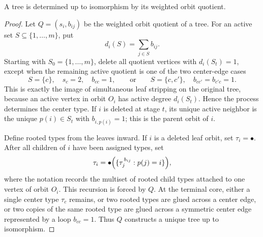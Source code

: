 \documentclass[10pt,a4paper]{amsart}
\begin{document}
\begin{theorem}
\label{thm:tree-quotient-rigidity}
A tree is determined up to isomorphism by its weighted orbit quotient.
\end{theorem}

\begin{proof}
Let \(Q=(s_i,b_{ij})\) be the weighted orbit quotient of a tree.  For an active
set \(S\subseteq\{1,\ldots,m\}\), put
\[
        d_i(S)=\sum_{j\in S} b_{ij}.
\]
Starting with \(S_0=\{1,\ldots,m\}\), delete all quotient vertices with
\(d_i(S_t)=1\), except when the remaining active quotient is one of the two
center-edge cases
\[
        S=\{c\},\quad s_c=2,\quad b_{cc}=1,
        \qquad\text{or}\qquad
        S=\{c,c'\},\quad b_{cc'}=b_{c'c}=1.
\]
This is exactly the image of simultaneous leaf stripping on the original tree,
because an active vertex in orbit \(O_i\) has active degree \(d_i(S_t)\).  Hence
the process determines the center type.  If \(i\) is deleted at stage \(t\), its
unique active neighbor is the unique \(p(i)\in S_t\) with \(b_{i,p(i)}=1\); this
is the parent orbit of \(i\).

Define rooted types from the leaves inward.  If \(i\) is a deleted leaf orbit,
set \(\tau_i=\bullet\).  After all children of \(i\) have been assigned types,
set
\[
        \tau_i=\bullet\Bigl(\{\tau_j^{\,b_{ij}}:p(j)=i\}\Bigr),
\]
where the notation records the multiset of rooted child types attached to one
vertex of orbit \(O_i\).  This recursion is forced by \(Q\).  At the terminal
core, either a single center type \(\tau_c\) remains, or two rooted types are
glued across a center edge, or two copies of the same rooted type are glued
across a symmetric center edge represented by a loop \(b_{cc}=1\).  Thus \(Q\)
constructs a unique tree up to isomorphism.
\end{proof}
\end{document}
